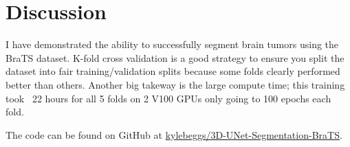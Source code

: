 \documentclass[10pt,twocolumn,letterpaper]{article}
\begin{document}
\section{Discussion}

I have demonstrated the ability to successfully segment brain tumors using the BraTS dataset. K-fold cross validation is a good strategy to ensure you split the dataset into fair training/validation splits because some folds clearly performed better than others. Another big takeway is the large compute time; this training took ~22 hours for all 5 folds on 2 V100 GPUs only going to 100 epochs each fold. 

The code can be found on GitHub at \href{https://github.com/kylebeggs/3D-UNet-Segmentation-BraTS}{kylebeggs/3D-UNet-Segmentation-BraTS}.

{\small


}
\end{document}

